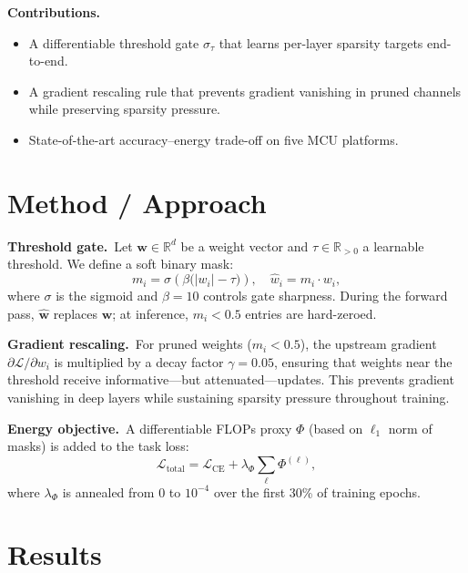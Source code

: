 \documentclass[10pt,twocolumn]{article}
\begin{document}
\textbf{Contributions.}
\begin{itemize}[leftmargin=1.2em,topsep=2pt,itemsep=1pt]
  \item A differentiable threshold gate $\sigma_\tau$ that learns per-layer
        sparsity targets end-to-end.
  \item A gradient rescaling rule that prevents gradient vanishing in pruned
        channels while preserving sparsity pressure.
  \item State-of-the-art accuracy–energy trade-off on five MCU platforms.
\end{itemize}

\section{Method / Approach}

\textbf{Threshold gate.}\ Let $\mathbf{w} \in \mathbb{R}^d$ be a weight
vector and $\tau \in \mathbb{R}_{>0}$ a learnable threshold.  We define a
soft binary mask:
\begin{equation}
  m_i = \sigma\!\left(\beta\bigl(|w_i| - \tau\bigr)\right), \quad
  \hat{w}_i = m_i \cdot w_i,
  \label{eq:gate}
\end{equation}
where $\sigma$ is the sigmoid and $\beta{=}10$ controls gate sharpness.
During the forward pass, $\hat{\mathbf{w}}$ replaces $\mathbf{w}$; at
inference, $m_i < 0.5$ entries are hard-zeroed.

\textbf{Gradient rescaling.}\ For pruned weights ($m_i < 0.5$), the
upstream gradient $\partial\mathcal{L}/\partial w_i$ is multiplied by a
decay factor $\gamma = 0.05$, ensuring that weights near the threshold
receive informative—but attenuated—updates.  This prevents gradient
vanishing in deep layers while sustaining sparsity pressure throughout
training.

\textbf{Energy objective.}\ A differentiable FLOPs proxy $\Phi$ (based on
$\ell_1$ norm of masks) is added to the task loss:
\begin{equation}
  \mathcal{L}_{\text{total}} = \mathcal{L}_{\text{CE}}
    + \lambda_\Phi \sum_{\ell} \Phi^{(\ell)},
  \label{eq:loss}
\end{equation}
where $\lambda_\Phi$ is annealed from 0 to $10^{-4}$ over the first
30\% of training epochs.

\section{Results}
\end{document}
